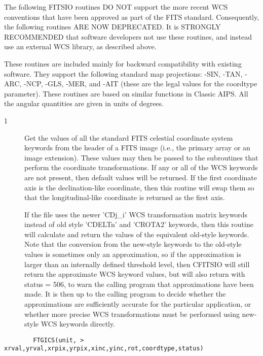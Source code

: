 \documentclass[11pt]{book}
\begin{document}
The following FITSIO routines DO NOT support the more recent WCS conventions
that have been approved as part of the FITS standard.  Consequently,
the following routines ARE NOW DEPRECATED.  It is STRONGLY RECOMMENDED
that software developers not use these routines, and instead use an
external WCS library, as described above.

These routines are included mainly for backward compatibility with
existing software.  They support the following standard map
projections: -SIN, -TAN, -ARC, -NCP, -GLS, -MER, and -AIT (these are the
legal values for the coordtype parameter).  These routines are based
on similar functions in Classic AIPS.  All the angular quantities are
given in units of degrees.


\begin{description}
\item[1 ] Get the values of all the standard FITS celestial coordinate system
    keywords from the header of a FITS image (i.e., the primary array or
    an image extension).  These values may then be passed to the subroutines
    that perform the coordinate transformations.  If any or all of the WCS
    keywords are not present, then default values will be returned. If
    the first coordinate axis is the declination-like coordinate, then
    this routine will swap them so that the longitudinal-like coordinate
    is returned as the first axis.

    If the file uses the newer 'CDj\_i' WCS transformation matrix
    keywords instead of old style 'CDELTn' and 'CROTA2' keywords, then
    this routine will calculate and return the values of the equivalent
    old-style keywords.    Note that the conversion from the new-style
    keywords to the old-style values is sometimes only an
    approximation, so if the approximation is larger than an internally
    defined threshold level, then CFITSIO will still return the
    approximate WCS keyword values, but will also return with status =
    506, to warn the calling program that approximations have been
    made.  It is then up to the calling program to decide whether the
    approximations are sufficiently accurate for the particular
    application, or whether more precise WCS transformations must be
   performed using new-style WCS keywords directly.
\end{description}

\begin{verbatim}
        FTGICS(unit, > xrval,yrval,xrpix,yrpix,xinc,yinc,rot,coordtype,status)
\end{verbatim}
\end{document}
